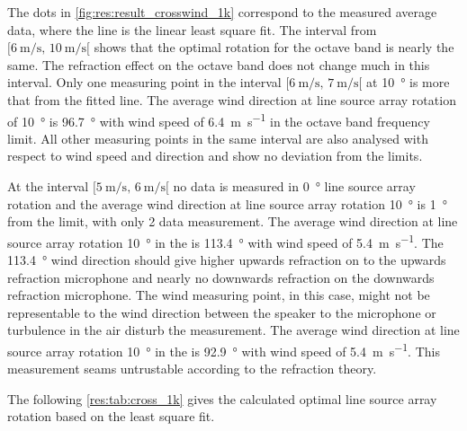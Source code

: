  
 The dots in \autoref{fig:res:result_crosswind_1k} correspond to the measured average data, where the line is the linear least square fit. The interval from $[\SI{6}{\meter\per\second},\, \SI{10}{\meter\per\second}[ $ shows that the optimal rotation for the  octave band is nearly the same. The refraction effect on the   octave band does not change much in this interval. Only one measuring point in the interval $[\SI{6}{\meter\per\second},\, \SI{7}{\meter\per\second}[ $ at \SI{10}{\degree} is more that  from the fitted line. The average wind direction at line source array rotation of \SI{10}{\degree} is \SI{96.7}{\degree} with wind speed of \SI{6.4}{\meter\per\second} in the  octave band frequency limit. All other measuring points in the same interval are also analysed with respect to wind speed and direction and show no deviation from the limits. 

At the interval $[\SI{5}{\meter\per\second},\, \SI{6}{\meter\per\second}[ $ no data is measured in \SI{0}{\degree} line source array rotation and the average wind direction at line source array rotation \SI{10}{\degree} is \SI{1}{\degree} from the limit, with only 2 data measurement. The average wind direction at line source array rotation \SI{10}{\degree} in the  is \SI{113.4}{\degree} with wind speed of \SI{5.4}{\meter\per\second}. The \SI{113.4}{\degree} wind direction should give higher upwards refraction on to the upwards refraction microphone and nearly no downwards refraction on the downwards refraction microphone. The wind measuring point, in this case, might not be representable to the wind direction between the speaker to the microphone or turbulence in the air disturb the measurement. The average wind direction at line source array rotation \SI{10}{\degree} in the  is \SI{92.9}{\degree} with wind speed of \SI{5.4}{\meter\per\second}.  This measurement seams untrustable according to the refraction theory.
 
 The following \autoref{res:tab:cross_1k} gives the calculated optimal line source array rotation based on the least square fit.
 
